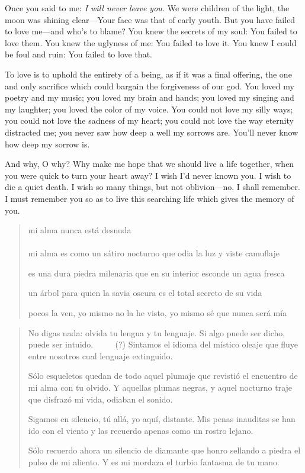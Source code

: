 \documentclass[a4paper, 12pt]{article}
\begin{document}
Once you said to me: \textit{I will never leave you.} We were children of the
light, the moon was shining clear---Your face was that of early youth. But you
have failed to love me---and who's to blame? You knew the secrets of my soul:
You failed to love them. You knew the uglyness of me: You failed to love it. You
knew I could be foul and ruin: You failed to love that.

To love is to uphold the entirety of a being, as if it was a final offering,
the one and only sacrifice which could bargain the forgiveness of our god.
You loved my poetry and my music;
you loved my brain and hands; you loved my singing and my laughter; you loved
the color of my voice. You could not love my silly ways; you could not love the
sadness of my heart; you could not love the way eternity distracted me; you never
saw how deep a well my sorrows are. You'll never know how deep my sorrow is.

And why, O why? Why make me hope that we should live a life together, when you
were quick to turn your heart away? I wish I'd never known you. I wish to die a
quiet death. I wish so many things, but not oblivion---no. I shall remember. I
must remember you so as to live this searching life which gives the memory of
you. 

\pagebreak 

\begin{verse}
    
mi alma nunca está desnuda\\

\\ 

mi alma es como un sátiro nocturno
que odia la luz y viste camuflaje

es una dura piedra milenaria
que en su interior esconde un agua fresca

un árbol para quien la savia oscura
es el total secreto de su vida

pocos la ven, yo mismo no la he visto,
yo mismo sé que nunca será mía




\end{verse}

\pagebreak

\begin{verse}
   No digas nada: olvida tu lengua y tu lenguaje.
   Si algo puede ser dicho, puede ser intuido. $\qquad$ (?)
   Sintamos el idioma del místico oleaje 
   que fluye entre nosotros cual lenguaje extinguido.

   Sólo esqueletos quedan de todo aquel plumaje 
   que revistió el encuentro de mi alma con tu olvido.
   Y aquellas plumas negras, y aquel nocturno traje
   que disfrazó mi vida, odiaban el sonido.

   Sigamos en silencio, tú allá, yo aquí, distante.
   Mis penas inauditas se han ido con el viento 
   y las recuerdo apenas como un rostro lejano.

   Sólo recuerdo ahora un silencio de diamante
   que honro sellando a piedra el pulso de mi aliento.
   Y es mi mordaza el turbio fantasma de tu mano.
   

\end{verse}
\end{document}
